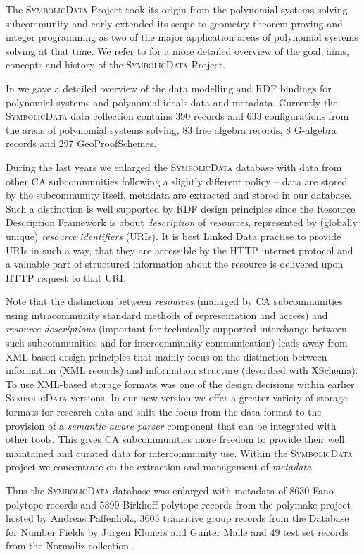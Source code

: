 \documentclass{mathincs}
\newcommand{\SD}{\textsc{Symbo\-lic\-Data}}
\begin{document}
The {\SD} Project took its origin from the polynomial systems solving
subcommunity and early extended its scope to geometry theorem proving and
integer programming as two of the major application areas of polynomial systems
solving at that time. We refer to \cite{cicm-14} for a more detailed overview
of the goal, aims, concepts and history of the {\SD} Project.

In \cite{car-55} we gave a detailed overview of the data modelling and RDF
bindings for polynomial systems and polynomial ideals data and metadata.
Currently the {\SD} data collection contains 390 records and 633 configurations
from the areas of polynomial systems solving, 83 free algebra records, 8
G-algebra records and 297 GeoProofSchemes.

During the last years we enlarged the {\SD} database with data from other CA
subcommunities following a slightly different policy -- data are stored by the
subcommunity itself, metadata are extracted and stored in our database.  Such a
distinction is well supported by RDF design principles since the Resource
Description Framework is about \emph{description} of \emph{resources},
represented by (globally unique) \emph{resource identifiers} (URIs). It is best
Linked Data practise to provide URIs in such a way, that they are accessible by
the HTTP internet protocol and a valuable part of structured information about
the resource is delivered upon HTTP request to that URI.

Note that the distinction between \emph{resources} (managed by CA
subcommunities using intracommunity standard methods of representation and
access) and \emph{resource descriptions} (important for technically supported
interchange between such subcommunities and for intercommunity communication)
leads away from XML based design principles that mainly focus on the
distinction between information (XML records) and information structure
(described with XSchema).  To use XML-based storage formats was one of the
design decisions within earlier {\SD} versions.  In our new version we offer a
greater variety of storage formats for research data and shift the focus from
the data format to the provision of a \emph{semantic aware parser} component
that can be integrated with other tools.  This gives CA subcommunities more
freedom to provide their well maintained and curated data for intercommunity
use.  Within the {\SD} project we concentrate on the extraction and management
of \emph{metadata}.

Thus the {\SD} database was enlarged with metadata of 8630 Fano polytope
records \cite{fano} and 5399 Birkhoff polytope records \cite{birkhoff} from the
polymake project \cite{polymake} hosted by Andreas Paffenholz, 3605 transitive
group records from the Database for Number Fields \cite{MalleKlueners} by 
J\"urgen Kl\"uners and Gunter Malle and 49 test set records from the Normaliz
collection \cite{normaliz}.
\end{document}
